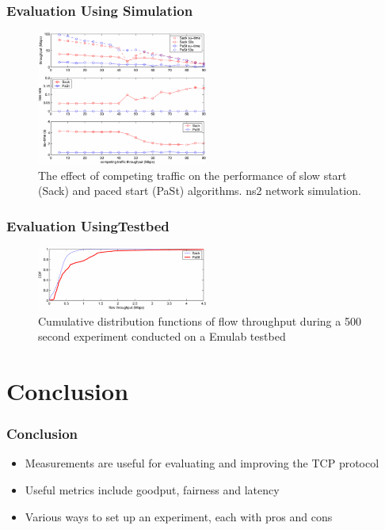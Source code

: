 \documentclass{beamer}
\begin{document}
\begin{frame}
\frametitle{Evaluation Using Simulation}
	\begin{figure}
	\includegraphics[width=0.5\textwidth]{images/hu03_competing_traffic.png}
	\caption{The effect of competing traffic on the performance of slow start (Sack) and paced start (PaSt) algorithms. ns2 network simulation.}
\end{figure}
\end{frame}

\begin{frame}
\frametitle{Evaluation UsingTestbed}
\begin{figure}
	\includegraphics[width=0.5\textwidth]{images/hu03_in_kernel.png}
	\caption{Cumulative distribution functions of flow throughput during a 500 second experiment conducted on a Emulab testbed}
\end{figure}

\end{frame}

\section{Conclusion}


\begin{frame}
\frametitle{Conclusion}
\begin{itemize}
	\item Measurements are useful for evaluating and improving the TCP protocol
	\item Useful metrics include goodput, fairness and latency
	\item Various ways to set up an experiment, each with pros and cons
\end{itemize}
\end{frame}
\end{document}
